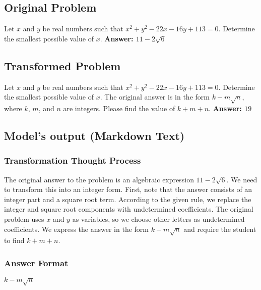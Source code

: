 \begin{tcolorbox}
\subsection*{Original Problem}
\vspace{-5pt}
Let $x$ and $y$ be real numbers such that $x^2 + y^2 - 22x - 16y + 113 = 0.$ Determine the smallest possible value of $x.$ \textbf{Answer: $11 - 2\sqrt{6}$}
\vspace{20pt}

\subsection*{Transformed Problem}
\vspace{-5pt}
Let $x$ and $y$ be real numbers such that $x^2 + y^2 - 22x - 16y + 113 = 0.$ Determine the smallest possible value of $x$. The original answer is in the form $k - m\sqrt{n}$, where $k$, $m$, and $n$ are integers. Please find the value of $k + m + n$. \textbf{Answer: $19$}

\vspace{20pt}
\subsection*{Model's output (Markdown Text)} 
\vspace{-2pt}

    \subsubsection*{Transformation Thought 
    Process}
    \vspace{-5pt}
    The original answer to the problem is an algebraic expression \(11 - 2\sqrt{6}.\)
    We need to transform this into an integer form. First, note that the answer consists of an integer part and a square root term. According to the given rule, we replace the integer and square root components with undetermined coefficients. The original problem uses \( x \) and \( y \) as variables, so we choose other letters as undetermined coefficients. We express the answer in the form 
    \(k - m\sqrt{n}\)
    and require the student to find \( k + m + n \).

    \subsubsection*{Answer Format}
    \vspace{-5pt}
    \(k - m\sqrt{n}\)


\end{tcolorbox}
